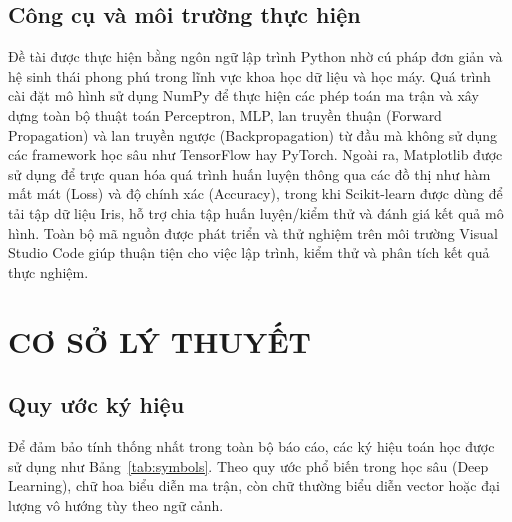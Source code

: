 \documentclass[12pt,a4paper]{report}
\begin{document}
\section{Công cụ và môi trường thực hiện}
Đề tài được thực hiện bằng ngôn ngữ lập trình Python nhờ cú pháp đơn giản và hệ sinh thái phong phú trong lĩnh vực khoa học dữ liệu và học máy. Quá trình cài đặt mô hình sử dụng NumPy để thực hiện các phép toán ma trận và xây dựng toàn bộ thuật toán Perceptron, MLP, lan truyền thuận (Forward Propagation) và lan truyền ngược (Backpropagation) từ đầu mà không sử dụng các framework học sâu như TensorFlow hay PyTorch. Ngoài ra, Matplotlib được sử dụng để trực quan hóa quá trình huấn luyện thông qua các đồ thị như hàm mất mát (Loss) và độ chính xác (Accuracy), trong khi Scikit-learn được dùng để tải tập dữ liệu Iris, hỗ trợ chia tập huấn luyện/kiểm thử và đánh giá kết quả mô hình. Toàn bộ mã nguồn được phát triển và thử nghiệm trên môi trường Visual Studio Code giúp thuận tiện cho việc lập trình, kiểm thử và phân tích kết quả thực nghiệm.

\chapter{CƠ SỞ LÝ THUYẾT}

\section{Quy ước ký hiệu}
Để đảm bảo tính thống nhất trong toàn bộ báo cáo, các ký hiệu toán học được sử dụng như Bảng~\ref{tab:symbols}. Theo quy ước phổ biến trong học sâu (Deep Learning), chữ hoa biểu diễn ma trận, còn chữ thường biểu diễn vector hoặc đại lượng vô hướng tùy theo ngữ cảnh.
\end{document}
